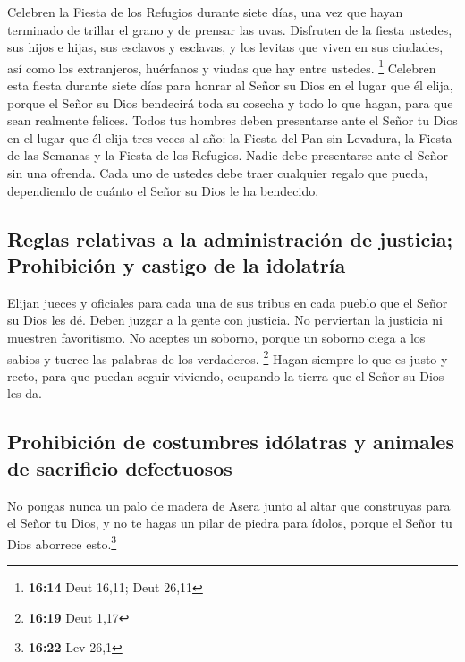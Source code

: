  Celebren la Fiesta de los Refugios durante siete días,
una vez que hayan terminado de trillar el grano y de prensar las uvas.
 Disfruten de la fiesta ustedes, sus hijos e hijas, sus
esclavos y esclavas, y los levitas que viven en sus ciudades, así como
los extranjeros, huérfanos y viudas que hay entre ustedes. \footnote{\textbf{16:14}
  Deut 16,11; Deut 26,11}  Celebren esta fiesta durante
siete días para honrar al Señor su Dios en el lugar que él elija, porque
el Señor su Dios bendecirá toda su cosecha y todo lo que hagan, para que
sean realmente felices.  Todos tus hombres deben
presentarse ante el Señor tu Dios en el lugar que él elija tres veces al
año: la Fiesta del Pan sin Levadura, la Fiesta de las Semanas y la
Fiesta de los Refugios. Nadie debe presentarse ante el Señor sin una
ofrenda.  Cada uno de ustedes debe traer cualquier regalo
que pueda, dependiendo de cuánto el Señor su Dios le ha bendecido.

\hypertarget{reglas-relativas-a-la-administraciuxf3n-de-justicia-prohibiciuxf3n-y-castigo-de-la-idolatruxeda}{%
\subsection{Reglas relativas a la administración de justicia;
Prohibición y castigo de la
idolatría}\label{reglas-relativas-a-la-administraciuxf3n-de-justicia-prohibiciuxf3n-y-castigo-de-la-idolatruxeda}}

 Elijan jueces y oficiales para cada una de sus tribus en
cada pueblo que el Señor su Dios les dé. Deben juzgar a la gente con
justicia.  No perviertan la justicia ni muestren
favoritismo. No aceptes un soborno, porque un soborno ciega a los sabios
y tuerce las palabras de los verdaderos. \footnote{\textbf{16:19} Deut
  1,17}  Hagan siempre lo que es justo y recto, para que
puedan seguir viviendo, ocupando la tierra que el Señor su Dios les da.

\hypertarget{prohibiciuxf3n-de-costumbres-iduxf3latras-y-animales-de-sacrificio-defectuosos}{%
\subsection{Prohibición de costumbres idólatras y animales de sacrificio
defectuosos}\label{prohibiciuxf3n-de-costumbres-iduxf3latras-y-animales-de-sacrificio-defectuosos}}

 No pongas nunca un palo de madera de Asera junto al
altar que construyas para el Señor tu Dios,  y no te
hagas un pilar de piedra para ídolos, porque el Señor tu Dios aborrece
esto.\footnote{\textbf{16:22} Lev 26,1}

